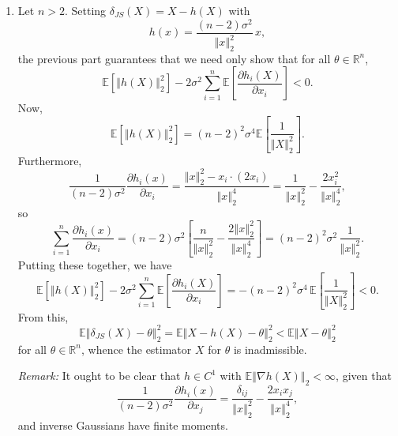 \documentclass[11pt]{article}
\newcommand{\R}{\mathbb{R}}
\newcommand{\norm}[1]{\left\Vert #1 \right\Vert}
\newcommand{\EE}{\mathbb{E}}
\begin{document}
\begin{enumerate}
\begin{enumerate}
            \item Let $n > 2$.
            Setting $\delta_{JS}(X) = X - h(X)$ with \[
                h(x) = \frac{(n - 2)\sigma^2}{\norm{x}_2^2}\, x,
            \] the previous part guarantees that we need only show that for all
            $\theta \in \R^n$, \[
                \EE[\norm{h(X)}_2^2] - 2\sigma^2\sum_{i = 1}^n \EE\left[\frac{\partial h_i(X)}{\partial x_i}\right] < 0.
            \] Now, \[
                \EE[\norm{h(X)}_2^2] = (n - 2)^2\sigma^4\EE\left[\frac{1}{\norm{X}_2^2}\right].
            \] Furthermore, \[
                \frac{1}{(n - 2)\sigma^2}\frac{\partial h_i(x)}{\partial x_i}
                    = \frac{\norm{x}_2^2 - x_i \cdot (2x_i)}{\norm{x}_2^4}
                    = \frac{1}{\norm{x}_2^2} - \frac{2x_i^2}{\norm{x}_2^4},
            \] so \[
                \sum_{i = 1}^n \frac{\partial h_i(x)}{\partial x_i}
                    = (n - 2)\sigma^2 \left[\frac{n}{\norm{x}_2^2} - \frac{2 \norm{x}_2^2}{\norm{x}_2^4}\right]
                    = (n - 2)^2\sigma^2\,\frac{1}{\norm{x}_2^2}.
            \] Putting these together, we have \[
                \EE[\norm{h(X)}_2^2] - 2\sigma^2\sum_{i = 1}^n \EE\left[\frac{\partial h_i(X)}{\partial x_i}\right]
                    = -(n - 2)^2\sigma^4\,\EE\left[\frac{1}{\norm{X}_2^2}\right]
                    < 0.
            \] From this, \[
                \EE\norm{\delta_{JS}(X) - \theta}_2^2
                    = \EE\norm{X - h(X) - \theta}_2^2
                    < \EE\norm{X - \theta}_2^2
            \] for all $\theta \in \R^n$, whence the estimator $X$ for $\theta$
            is inadmissible.

            \emph{Remark:} It ought to be clear that $h \in C^1$ with
            $\EE\norm{\nabla h(X)}_2 < \infty$, given that \[
                \frac{1}{(n - 2)\sigma^2}\frac{\partial h_i(x)}{\partial x_j}
                    = \frac{\delta_{ij}}{\norm{x}_2^2} - \frac{2x_ix_j}{\norm{x}_2^4},
            \] and inverse Gaussians have finite moments.
        \end{enumerate}



\end{enumerate}
\end{document}
